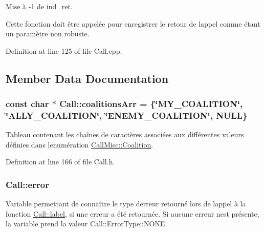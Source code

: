Mise à -\/1 de {\ttfamily ind\+\_\+ret}. 

Cette fonction doit être appelée pour enregistrer le retour de l\textquotesingle{}appel comme étant un paramètre non robuste. 

Definition at line 125 of file Call.\+cpp.



\subsection{Member Data Documentation}
\subsubsection[{\texorpdfstring{coalitions\+Arr}{coalitionsArr}}]{\setlength{\rightskip}{0pt plus 5cm}const char $\ast$ Call\+::coalitions\+Arr = \{\char`\"{}M\+Y\+\_\+\+C\+O\+A\+L\+I\+T\+I\+ON\char`\"{}, \char`\"{}A\+L\+L\+Y\+\_\+\+C\+O\+A\+L\+I\+T\+I\+ON\char`\"{}, \char`\"{}E\+N\+E\+M\+Y\+\_\+\+C\+O\+A\+L\+I\+T\+I\+ON\char`\"{}, N\+U\+LL\}\hspace{0.3cm}{\ttfamily [static]}}\hypertarget{class_call_a69386ad6806856e50ad09edf31998dc2}{}\label{class_call_a69386ad6806856e50ad09edf31998dc2}
Tableau contenant les chaînes de caractères associées aux différentes valeurs définies dans l\textquotesingle{}enumération \hyperlink{namespace_call_misc_a490b3c2ef1a821675848ebcab0b677d8}{Call\+Misc\+::\+Coalition}. 

Definition at line 166 of file Call.\+h.

\subsubsection[{\texorpdfstring{error}{error}}]{ Call\+::error\hspace{0.3cm}{\ttfamily [protected]}}\hypertarget{class_call_a206f6150a8038fda48c17c2c7421aed1}{}\label{class_call_a206f6150a8038fda48c17c2c7421aed1}
Variable permettant de connaître le type d\textquotesingle{}erreur retourné lors de l\textquotesingle{}appel à la fonction \hyperlink{class_call_ad6b8343d530798fdb48407b3f2489ae7}{Call\+::label}, si une erreur a été retournée. Si aucune erreur n\textquotesingle{}est présente, la variable prend la valeur Call\+::\+Error\+Type\+::\+N\+O\+NE. 

